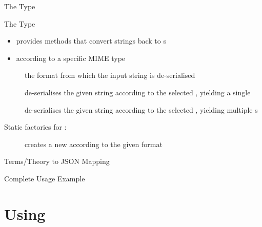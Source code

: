 \documentclass[handout]{beamer}
\begin{document}
\begin{frame}[allowframebreaks]{The  Type}
    
    \begin{block}{The  Type}
        \begin{itemize}
            \item provides methods that convert strings back to s
            \item according to a specific MIME type
        \end{itemize}
    \end{block}
    \begin{description}
        \item [] the format from which the input string is de-serialised
        \item [] de-serialises the given string according to the selected , yielding a single 
        \item []  de-serialises the given string according to the selected , yielding multiple s
    \end{description}

    \framebreak

    Static factories for :
    \begin{description}
        \item [] creates a new  according to the given format
    \end{description}

\end{frame}

\begin{frame}[allowframebreaks]{Terms/Theory to JSON Mapping}
    
\end{frame}

\begin{frame}[allowframebreaks]{Complete Usage Example}
\end{frame}

\section{Using \twopkt}
\end{document}
